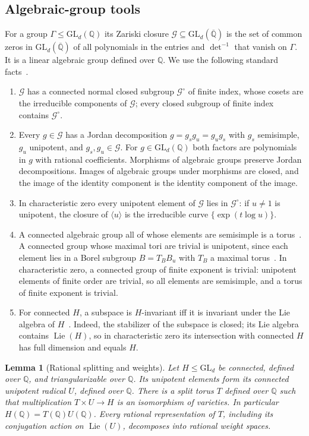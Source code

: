 \documentclass[11pt,letterpaper]{article}
\newcommand{\Q}{\mathbb{Q}}
\newcommand{\Qb}{\overline{\mathbb{Q}}}
\newcommand{\cG}{\mathcal{G}}
\newcommand{\GL}{\mathrm{GL}}
\newtheorem{lemma}[theorem]{Lemma}
\theoremstyle{definition}
\begin{document}
\subsection{Algebraic-group tools}
For a group $\Gamma\le\GL_d(\Q)$ its Zariski closure $\cG\subseteq\GL_d(\Qb)$ is the set of common zeros in $\GL_d(\Qb)$ of all polynomials in the entries and $\det^{-1}$ that vanish on $\Gamma$. It is a linear algebraic group defined over $\Q$. We use the following standard facts~\cite{Bor91,Hum75}.
\begin{enumerate}
\item[(A1)] $\cG$ has a connected normal closed subgroup $\cG^\circ$ of finite index, whose cosets are the irreducible components of $\cG$; every closed subgroup of finite index contains $\cG^\circ$.
\item[(A2)] Every $g\in\cG$ has a Jordan decomposition $g=g_sg_u=g_ug_s$ with $g_s$ semisimple, $g_u$ unipotent, and $g_s,g_u\in\cG$. For $g\in\GL_d(\Q)$ both factors are polynomials in $g$ with rational coefficients. Morphisms of algebraic groups preserve Jordan decompositions. Images of algebraic groups under morphisms are closed, and the image of the identity component is the identity component of the image.
\item[(A3)] In characteristic zero every unipotent element of $\cG$ lies in $\cG^\circ$: if $u\ne1$ is unipotent, the closure of $\langle u\rangle$ is the irreducible curve $\{\exp(t\log u)\}$.
\item[(A4)] A connected algebraic group all of whose elements are semisimple is a torus~\cite{Bor91}. A connected group whose maximal tori are trivial is unipotent, since each element lies in a Borel subgroup $B=T_BB_u$ with $T_B$ a maximal torus~\cite{Bor91}. In characteristic zero, a connected group of finite exponent is trivial: unipotent elements of finite order are trivial, so all elements are semisimple, and a torus of finite exponent is trivial.
\item[(A5)] For connected $H$, a subspace is $H$-invariant iff it is invariant under the Lie algebra of $H$~\cite{Hum75}. Indeed, the stabilizer of the subspace is closed; its Lie algebra contains $\operatorname{Lie}(H)$, so in characteristic zero its intersection with connected $H$ has full dimension and equals $H$.
\end{enumerate}
\begin{lemma}[Rational splitting and weights]\label{lem:split}
Let $H\le\GL_d$ be connected, defined over $\Q$, and triangularizable over $\Q$. Its unipotent elements form its connected unipotent radical $U$, defined over $\Q$. There is a split torus $T$ defined over $\Q$ such that multiplication $T\times U\to H$ is an isomorphism of varieties. In particular $H(\Q)=T(\Q)U(\Q)$. Every rational representation of $T$, including its conjugation action on $\operatorname{Lie}(U)$, decomposes into rational weight spaces.
\end{lemma}
\end{document}

